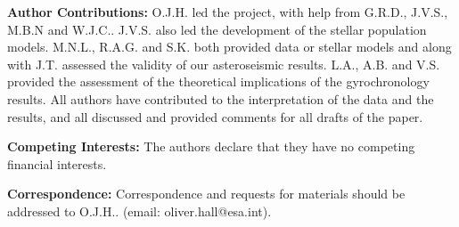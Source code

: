 \documentclass[12pt]{article}
\begin{document}
%

\textbf{Author Contributions:} O.J.H. led the project, with help from G.R.D., J.V.S., M.B.N and W.J.C.. J.V.S. also led the development of the stellar population models. M.N.L., R.A.G. and S.K. both provided data or stellar models and along with J.T. assessed the validity of our asteroseismic results. L.A., A.B. and V.S. provided the assessment of the theoretical implications of the gyrochronology results. All authors have contributed to the interpretation of the data and the results, and all discussed and provided comments for all drafts of the paper.

\textbf{Competing Interests:} The authors declare that they have no competing financial interests.

\textbf{Correspondence:} Correspondence and requests for materials should be addressed to O.J.H.. (email: oliver.hall@esa.int).

\clearpage






\end{document}
